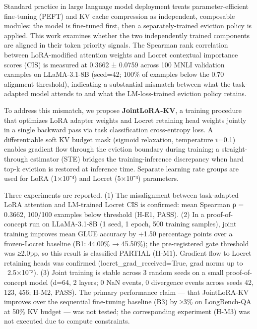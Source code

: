 
Standard practice in large language model deployment treats parameter-efficient fine-tuning (PEFT) and KV cache compression as independent, composable modules: the model is fine-tuned first, then a separately-trained eviction policy is applied. This work examines whether the two independently trained components are aligned in their token priority signals. The Spearman rank correlation between LoRA-modified attention weights and Locret contextual importance scores (CIS) is measured at 0.3662 ± 0.0759 across 100 MNLI validation examples on LLaMA-3.1-8B (seed=42; 100\% of examples below the 0.70 alignment threshold), indicating a substantial mismatch between what the task-adapted model attends to and what the LM-loss-trained eviction policy retains.

To address this mismatch, we propose \textbf{JointLoRA-KV}, a training procedure that optimizes LoRA adapter weights and Locret retaining head weights jointly in a single backward pass via task classification cross-entropy loss. A differentiable soft KV budget mask (sigmoid relaxation, temperature τ=0.1) enables gradient flow through the eviction boundary during training; a straight-through estimator (STE) bridges the training-inference discrepancy when hard top-k eviction is restored at inference time. Separate learning rate groups are used for LoRA (1×10⁻⁴) and Locret (5×10⁻⁴) parameters.

Three experiments are reported. (1) The misalignment between task-adapted LoRA attention and LM-trained Locret CIS is confirmed: mean Spearman ρ = 0.3662, 100/100 examples below threshold (H-E1, PASS). (2) In a proof-of-concept run on LLaMA-3.1-8B (1 seed, 1 epoch, 500 training samples), joint training improves mean GLUE accuracy by +1.50 percentage points over a frozen-Locret baseline (B1: 44.00\% → 45.50\%); the pre-registered gate threshold was ≥2.0pp, so this result is classified PARTIAL (H-M1). Gradient flow to Locret retaining heads was confirmed (locret_grad_received=True, grad norms up to ~2.5×10⁻³). (3) Joint training is stable across 3 random seeds on a small proof-of-concept model (d=64, 2 layers; 0 NaN events, 0 divergence events across seeds 42, 123, 456; H-M2, PASS). The primary performance claim — that JointLoRA-KV improves over the sequential fine-tuning baseline (B3) by ≥3\% on LongBench-QA at 50\% KV budget — was not tested; the corresponding experiment (H-M3) was not executed due to compute constraints.

